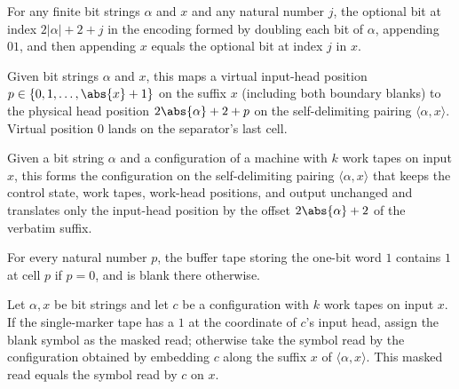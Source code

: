 \begin{lemma}
\label{Turing.universal_pair_suffix}
\leanok
{}
For any finite bit strings $\alpha$ and $x$ and any natural number $j$, the optional bit
at index $2|\alpha|+2+j$ in the encoding formed by doubling each bit of $\alpha$,
appending $01$, and then appending $x$ equals the optional bit at index $j$ in $x$.
\end{lemma}

\begin{definition}
\label{Turing.universalInputPos}
\leanok
{}
Given bit strings $\alpha$ and $x$, this maps a virtual input-head position
$p \in \{0, 1, \dots, \abs{x}+1\}$ on the suffix $x$ (including both boundary
blanks) to the physical head position $2\abs{\alpha}+2+p$ on the
self-delimiting pairing $\langle \alpha, x\rangle$.  Virtual position $0$
lands on the separator's last cell.
\end{definition}

\begin{definition}
\label{Turing.universalInputCfg}
\leanok
{}
Given a bit string $\alpha$ and a configuration of a machine with $k$ work
tapes on input $x$, this forms the configuration on the self-delimiting
pairing $\langle \alpha, x\rangle$ that keeps the control state, work tapes,
work-head positions, and output unchanged and translates only the input-head
position by the offset $2\abs{\alpha}+2$ of the verbatim suffix.
\end{definition}

\begin{lemma}
\label{Turing.universal_marker}
\leanok
{}
For every natural number $p$, the buffer tape storing the one-bit word $1$ contains $1$
at cell $p$ if $p=0$, and is blank there otherwise.
\end{lemma}

\begin{lemma}
\label{Turing.universalInput_read}
\leanok
{}
Let $\alpha,x$ be bit strings and let $c$ be a configuration with $k$ work tapes on
input $x$. If the single-marker tape has a $1$ at the coordinate of $c$'s input head,
assign the blank symbol as the masked read; otherwise take the symbol read by the
configuration obtained by embedding $c$ along the suffix $x$ of
$\langle\alpha,x\rangle$. This masked read equals the symbol read by $c$ on $x$.
\end{lemma}

